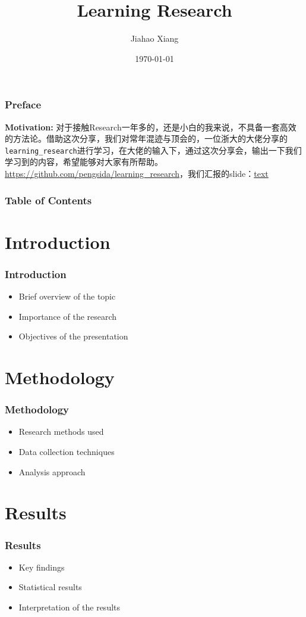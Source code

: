 \documentclass{beamer}
\title{\textbf{Learning Research}}
\author[xjh]{Jiahao Xiang\inst{1}}
\institute{
    \inst{1}
    Hengyang Normal University
}
\date{\today}
\begin{document}
\begin{frame}
    \titlepage
\end{frame}

\begin{frame}
    \frametitle{Preface}
    \textbf{Motivation:} 对于接触Research一年多的，还是小白的我来说，不具备一套高效的方法论。借助这次分享，我们对常年混迹与顶会的，一位浙大的大佬分享的\texttt{learning\_research}进行学习，在大佬的输入下，通过这次分享会，输出一下我们学习到的内容，希望能够对大家有所帮助。
    \vfill
    \href{https://github.com/pengsida/learning_research}{https://github.com/pengsida/learning\_research}，我们汇报的slide：\href{URL}{text}
\end{frame}

\begin{frame}
    \frametitle{Table of Contents}
    \tableofcontents
\end{frame}

\section{Introduction}
\begin{frame}
    \frametitle{Introduction}
    \begin{itemize}
        \item Brief overview of the topic
        \item Importance of the research
        \item Objectives of the presentation
    \end{itemize}
\end{frame}

\section{Methodology}
\begin{frame}
    \frametitle{Methodology}
    \begin{itemize}
        \item Research methods used
        \item Data collection techniques
        \item Analysis approach
    \end{itemize}
\end{frame}

\section{Results}
\begin{frame}
    \frametitle{Results}
    \begin{itemize}
        \item Key findings
        \item Statistical results
        \item Interpretation of the results
    \end{itemize}
\end{frame}
\end{document}
